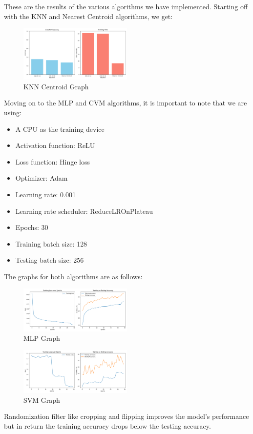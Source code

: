 These are the results of the various algorithms we have implemented.
Starting off with the KNN and Nearest Centroid algorithms, we get:
\begin{figure}[H]
    \centering
    \includegraphics[width=0.5\textwidth]{media/knn_centroid.png}
    \caption{KNN Centroid Graph}
\end{figure}

Moving on to the MLP and CVM algorithms, it is important to note that
we are using:
\begin{itemize}
    \item A CPU as the training device
    \item Activation function: ReLU
    \item Loss function: Hinge loss
    \item Optimizer: Adam 
    \item Learning rate: 0.001
    \item Learning rate scheduler: ReduceLROnPlateau 
    \item Epochs: 30
    \item Training batch size: 128
    \item Testing batch size: 256
\end{itemize}

The graphs for both algorithms are as follows:
\begin{figure}[H]
    \centering
    \includegraphics[width=0.5\textwidth]{media/mlp.png}
    \caption{MLP Graph}
\end{figure}

\begin{figure}[H]
    \centering
    \includegraphics[width=0.5\textwidth]{media/svm.png}
    \caption{SVM Graph}
\end{figure}
Randomization filter like cropping and flipping improves the model's performance
but in return the training accuracy drops below the testing accuracy.\\

